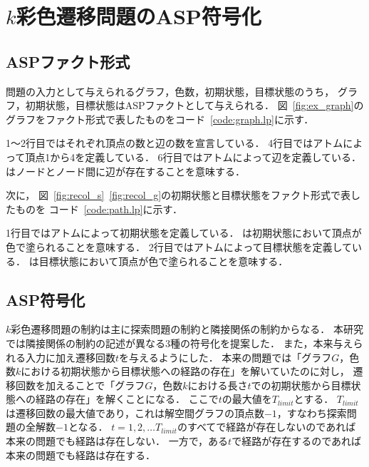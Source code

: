 \chapter{$k$彩色遷移問題のASP符号化} \label{chap:proposal}

\section{ASPファクト形式}
問題の入力として与えられるグラフ，色数，初期状態，目標状態のうち，
グラフ，初期状態，目標状態はASPファクトとして与えられる．
図~\ref{fig:ex_graph}のグラフをファクト形式で表したものをコード~\ref{code:graph.lp}に示す．



1～2行目ではそれぞれ頂点の数と辺の数を宣言している．
4行目ではアトムによって頂点1から4を定義している．
6行目ではアトムによって辺を定義している．
はノードとノード間に辺が存在することを意味する．

次に， 図~\ref{fig:recol_s}~\ref{fig:recol_g}の初期状態と目標状態をファクト形式で表したものを
コード~\ref{code:path.lp}に示す．



1行目ではアトムによって初期状態を定義している．
は初期状態において頂点が色で塗られることを意味する．
2行目ではアトムによって目標状態を定義している．
は目標状態において頂点が色で塗られることを意味する．

\section{ASP符号化}
$k$彩色遷移問題の制約は主に探索問題の制約と隣接関係の制約からなる．
本研究では隣接関係の制約の記述が異なる3種の符号化を提案した．
また，本来与えられる入力に加え遷移回数$t$を与えるようにした．
本来の問題では「グラフ$G$，色数$k$における初期状態から目標状態への経路の存在」を解いていたのに対し，
遷移回数を加えることで「グラフ$G$，色数$k$における長さ$t$での初期状態から目標状態への経路の存在」を解くことになる．
ここで$t$の最大値を$T_{limit}$とする．
$T_{limit}$は遷移回数の最大値であり，これは解空間グラフの頂点数$-1$，すなわち探索問題の全解数$-1$となる．
$t=1, 2, \dots T_{limit}$のすべてで経路が存在しないのであれば本来の問題でも経路は存在しない．
一方で，ある$t$で経路が存在するのであれば本来の問題でも経路は存在する．

